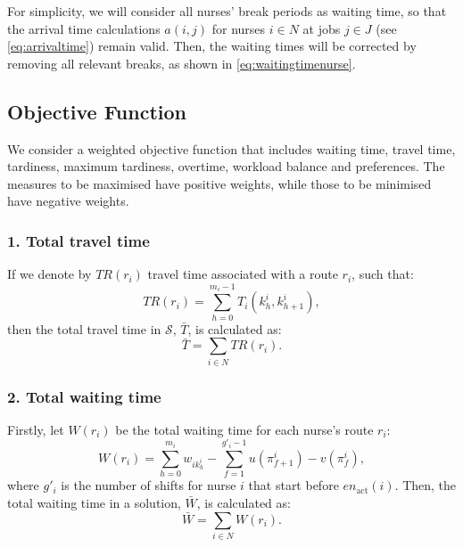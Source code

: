 \documentclass[a4paper,11pt,authoryear]{elsarticle}
\begin{document}
For simplicity, we will consider all nurses' break periods as waiting time, so that the arrival time calculations $a(i,j)$ for nurses $i \in N$ at jobs $j \in J$ (see \eqref{eq:arrivaltime}) remain valid. Then, the waiting times will be corrected by removing all relevant breaks, as shown in \eqref{eq:waitingtimenurse}.


\subsection{Objective Function}
\label{sub:objectivefunc}
\noindent We consider a weighted objective function that includes waiting time, travel time, tardiness, maximum tardiness, overtime, workload balance and preferences. The measures to be maximised have positive weights, while those to be minimised have negative weights.

\subsubsection*{1. Total travel time}
\noindent If we denote by $TR(r_i)$ travel time associated with a route $r_i$, such that:
\begin{equation}
	TR(r_i) =  \sum_{h = 0}^{m_i - 1} T_i(k^i_h, k^i_{h + 1}), \label{eq:traveltimenurse}
\end{equation}
then the total travel time in $\mathcal{S}$, $\bar{T}$, is calculated as:
\begin{equation}
	\bar{T} = \sum_{i \in N}  TR(r_i). \label{eq:totaltraveltime}
\end{equation}

\subsubsection*{2. Total waiting time}
\noindent Firstly, let $W(r_i)$ be the total waiting time for each nurse's route $r_i$:
\begin{equation}
	W(r_i) = \displaystyle\sum_{h=0}^{m_i} w_{i k_{h}^i} - \displaystyle\sum_{f=1}^{g'_i - 1} u(\pi_{f+1}^i) - v(\pi_f^i), \label{eq:waitingtimenurse}
\end{equation}
\noindent where $g'_i$ is the number of shifts for nurse $i$ that start before $en_{\text{act}}(i)$. Then, the total waiting time in a solution, $\bar{W}$, is calculated as:
\begin{equation}
     \bar{W} = \sum_{i \in N} W(r_i). \label{eq:totalwaitingtime}
\end{equation}
\end{document}
